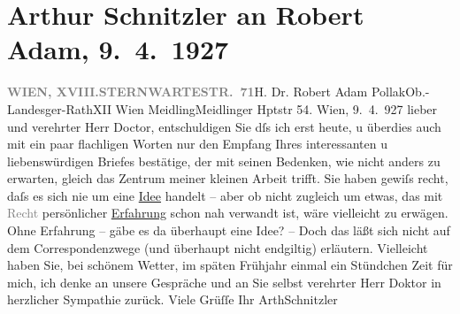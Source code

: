 

         
         \renewcommand{\erwaehntePersonen}{Personen: Robert Adam}
         \renewcommand{\erwaehnteOrte}{Orte: Meidlinger Hauptstraße, Sternwartestraße, Wien, XII., Meidling, XVIII., Währing}
         \renewcommand{\erwaehnteWerke}{Werke: Der Geist im Wort und der Geist in der Tat}
               \section[Arthur Schnitzler an Robert Adam, 9. 4. 1927]{ Arthur Schnitzler an Robert Adam, 9. 4. 1927}\nopagebreak{}\rehead{ }\begin{ledgroupsized}[t]{13cm}\normalsize\beginnumbering \toendnotes[C]{\smallbreak\pagebreak[2]} 
\toendnotes[C]{\smallbreak}\pstart{}{\pb}\label{T_L02484-1v}\label{T_L02484-1h}\pend{}\pstart{}\textcolor{gray}{\textbf{WIEN, XVIII.}}\pend{}\pstart{}\textcolor{gray}{\textbf{STERNWARTESTR. 71}}\pend{}{\bigskip}\pstart{}H. Dr. Robert Adam Pollak\pend{}\pstart{}Ob.-Landesger-Rath\pend{}\pstart{}XII Wien Meidling\pend{}\pstart{}Meidlinger Hptstr 54.\pend{}{\bigskip}\pstart
           \raggedleft{}{\pb}Wien, 9. 4. 927\pend
           \pstart
           lieber und verehrter Herr Doctor, entschuldigen Sie dſs ich erst
               heute, u überdies auch mit ein paar flachligen Worten nur den Empfang Ihres
               interessanten u liebenswürdigen Briefes bestätige, der mit seinen Bedenken, wie nicht
               anders zu erwarten, gleich das Zentrum meiner kleinen Arbeit trifft. Sie haben gewiſs recht, daſs es sich nie um
               eine \uline{Idee} handelt – aber ob nicht zugleich um etwas,
               das mit \textcolor{gray}{Recht} persönlicher \uline{Erfahrung} schon nah verwandt ist, wäre vielleicht zu erwägen. Ohne Erfahrung
               – gäbe es da{\geminationn} überhaupt eine Idee? – Doch das läßt {\pb}sich nicht auf dem Correspondenzwege (und überhaupt nicht
               endgiltig) erläutern. Vielleicht haben Sie, bei schönem Wetter, im späten Frühjahr
               einmal ein Stündchen Zeit für mich, ich denke an unsere Gespräche und an Sie selbst
               verehrter Herr Doktor in herzlicher Sympathie zurück.\pend
           \pstart Viele Grüſſe Ihr \spacefill\mbox{ArthSchnitzler}\pend{}
         

\end{ledgroupsized}
